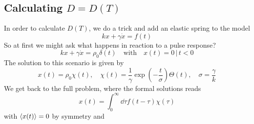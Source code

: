 \documentclass{notebook}
\begin{document}
\subsection*{Calculating $D = D(T)$}

In order to calculate $D(T)$, we do a trick and add an elastic spring to the model
%
\begin{equation}
k x + \gamma \dot{x} = f(t)
\end{equation}
%
So at first we might ask what happens in reaction to a pulse response?
%
\begin{equation}
k x + \gamma \dot{x} = \rho_0 \delta(t) \quad \mathrm{with} \quad x(t) = 0 \, | \, t < 0
\end{equation}
%
The solution to this scenario is given by
%
\begin{equation}
x(t) = \rho_0 \chi(t), \quad \chi(t) = \frac{1}{\gamma} \exp(-\frac{t}{\sigma}) \Theta(t), \quad \sigma = \frac{\gamma}{k}
\end{equation}
%
We get back to the full problem, where the formal solutions reads
%
\begin{equation}
x(t) =  \int_0^{\infty}{\dd{\tau} f(t - \tau) \chi(\tau)}
\end{equation}
%
with $\expval{x(t)} = 0$ by symmetry and 
\end{document}
